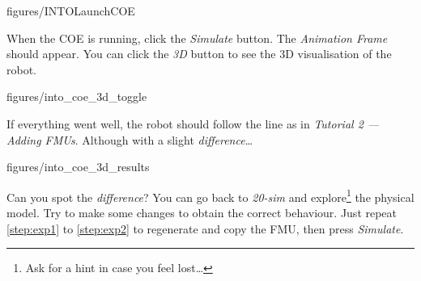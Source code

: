 \documentclass[11pt,a4paper]{../tutorial}
\begin{document}
\begin{instructions}
    \begin{annotation}[width=0.85\linewidth,trim=0 270 0 120,clip]{figures/INTOLaunchCOE}
    \end{annotation}

\item When the COE is running, click the \emph{Simulate} button. The \emph{Animation Frame} should appear. You can click the \emph{3D} button to see the 3D visualisation of the robot.

    \begin{annotation}[width=0.55\linewidth,trim=0 0 0 0,clip]{figures/into_coe_3d_toggle}
    \end{annotation}

\item If everything went well, the robot should follow the line as in \emph{Tutorial 2 --- Adding FMUs}. Although with a slight \emph{difference}\ldots

    \begin{annotation}[width=0.55\linewidth,trim=0 300 0 0,clip]{figures/into_coe_3d_results}
    \end{annotation}

    Can you spot the \emph{difference}? You can go back to \emph{20-sim} and explore\footnote{Ask for a hint in case you feel lost\ldots} the physical model. Try to make some changes to obtain the correct behaviour. Just repeat \ref{step:exp1} to \ref{step:exp2} to regenerate and copy the FMU, then press \emph{Simulate}.

\end{instructions}
\end{document}
